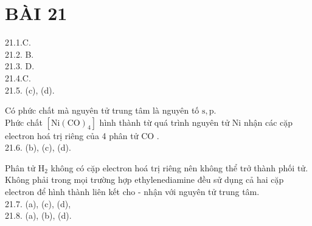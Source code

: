 \documentclass[10pt]{article}
\begin{document}
\section*{BÀI 21}
21.1.C.\\
21.2. B.\\
21.3. D.\\
21.4.C.\\
21.5. (c), (d).

Có phức chất mà nguyên tử trung tâm là nguyên tố $\mathrm{s}, \mathrm{p}$.\\
Phức chất $\left[\mathrm{Ni}(\mathrm{CO})_{4}\right]$ hình thành từ quá trình nguyên tử Ni nhận các cặp electron hoá trị riêng của 4 phân tử CO .\\
21.6. (b), (c), (d).

Phân tử $\mathrm{H}_{2}$ không có cặp electron hoá trị riêng nên không thể trở thành phối tử. Không phải trong mọi trường hợp ethylenediamine đều sử dụng cả hai cặp electron để hình thành liên kết cho - nhận với nguyên tử trung tâm.\\
21.7. (a), (c), (d),\\
21.8. (a), (b), (d).
\end{document}
